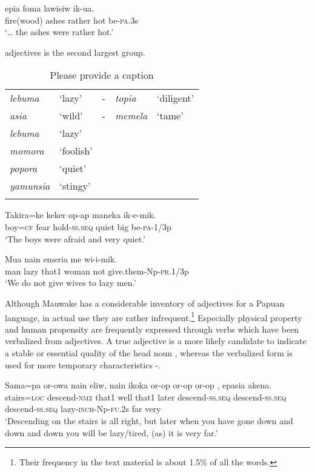 \ea%
\label{ex:3:x1758}
\gll {\dots}epia foma lawisiw  ik-ua. \\
fire(wood) ashes rather hot be-\textsc{pa}.3s\\
\glt`{\dots} the ashes were rather hot.'
\z

 adjectives is the second largest group. 


\begin{table}
\caption{Please provide a caption}
 
\begin{tabular}{>{\itshape}llc>{\itshape}ll}
\mytoprule
lebuma &`lazy' &- &topia &`diligent'\\
asia &`wild' &- &memela &`tame'\\
lebuma &`lazy'&&&\\
momora &`foolish'&&&\\
popora &`quiet'&&&\\
yamunsia &`stingy'&&&\\
\mybottomrule
\end{tabular}
\end{table}

\ea%
\label{ex:3:x1757}
\gll Takira=ke keker op-ap  maneka ik-e-mik. \\
boy=\textsc{cf} fear hold-\textsc{ss}.\textsc{seq} quiet big be-\textsc{pa}-1/3p\\
\glt`The boys were afraid and very quiet.'
\z

\ea%
\label{ex:3:x1418}
\gll Mua  nain emeria me wi-i-mik. \\
man lazy that1 woman not give.them-Np-\textsc{pr}.1/3p\\
\glt`We do not give wives to lazy men.'
\z

Although Mauwake has a considerable inventory of adjectives for a Papuan language, in actual use they are rather infrequent.\footnote{Their frequency in the text material is about 1.5\% of all the words.} Especially physical property and human propensity are frequently expressed through verbs which have been verbalized from adjectives. A true adjective is a more likely candidate to indicate a stable or essential quality of the head noun , whereas the verbalized form is used for more temporary characteristics -.

\ea%
\label{ex:3:x1419}
\gll Sama=pa or-owa nain eliw, nain ikoka or-op or-op or-op , epasia akena.\\
stairs=\textsc{loc} descend-\textsc{nmz} that1 well that1 later descend-\textsc{ss}.\textsc{seq} descend-\textsc{ss}.\textsc{seq} descend-\textsc{ss}.\textsc{seq} lazy-\textsc{inch}-Np-\textsc{fu}.2s far very\\
\glt`Descending on the stairs is all right, but later when you have gone down and down and down you will be lazy/tired, (as) it is very far.'
\z

